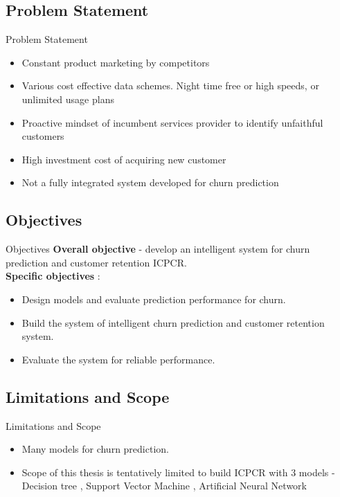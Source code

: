 \documentclass{beamer}
\begin{document}
\subsection{Problem Statement}
\begin{frame}{Problem Statement}
	\begin{itemize}
		\item Constant product marketing by competitors
		\item Various cost effective data schemes. Night time free or high speeds, or unlimited usage plans
		\item Proactive mindset of incumbent services provider to identify unfaithful customers
		\item High investment cost of acquiring new customer
		\item Not a fully integrated system developed for churn prediction
	\end{itemize}
\end{frame}

\subsection{Objectives}
\begin{frame}{Objectives}
	\textbf{Overall objective} - develop an intelligent system for churn prediction and customer retention ICPCR.\\	
	\textbf{Specific objectives} :
	\begin{itemize}
		\item {
			Design models and evaluate prediction performance for churn.
		}
		\item {
			Build the system of intelligent churn prediction and customer retention system.
		}
		\item Evaluate the system for reliable performance.
	\end{itemize}
\end{frame}


\subsection{Limitations and Scope}
\begin{frame}{Limitations and Scope}
	\begin{itemize}
		\item {
			Many models for churn prediction.
		}
		\item Scope of this thesis is tentatively limited to build ICPCR with 3 models - Decision tree , Support Vector Machine , Artificial Neural Network
	\end{itemize}
\end{frame}
\end{document}
